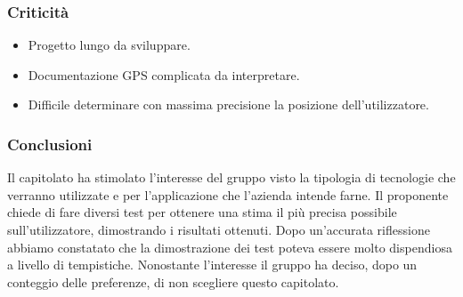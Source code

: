 	\subsubsection{Criticità}
		\begin{itemize}
			\item Progetto lungo da sviluppare.
			\item Documentazione GPS complicata da interpretare.
			\item Difficile determinare con massima precisione la posizione dell'utilizzatore.
		\end{itemize}
	
	\subsubsection{Conclusioni}
		Il capitolato ha stimolato l'interesse del gruppo visto la tipologia di tecnologie che verranno utilizzate e per l'applicazione che l'azienda intende farne. Il proponente chiede di fare diversi test per ottenere una stima il più precisa possibile sull'utilizzatore, dimostrando i risultati ottenuti. Dopo un'accurata riflessione abbiamo constatato che la dimostrazione dei test poteva essere molto dispendiosa a livello di tempistiche. Nonostante l'interesse il gruppo ha deciso, dopo un conteggio delle preferenze, di non scegliere questo capitolato.

